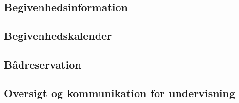 \subsection{Begivenhedsinformation}

\subsection{Begivenhedskalender}

\subsection{Bådreservation}

\subsection{Oversigt og kommunikation for undervisning}